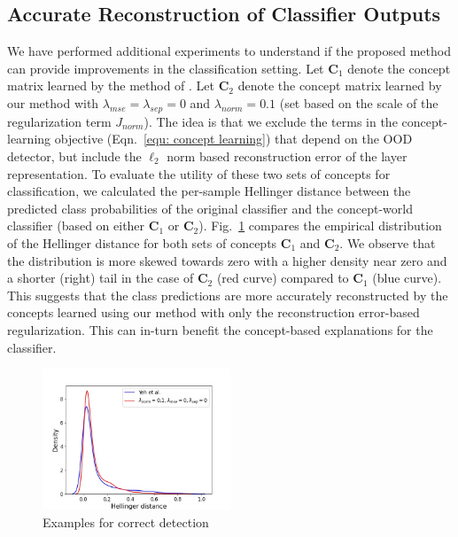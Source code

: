 \subsection{Accurate Reconstruction of Classifier Outputs}
\label{app:hellinger}
We have performed additional experiments to understand if the proposed method can provide improvements in the classification setting. 
Let $\mathbf{C}_1$ denote the concept matrix learned by the method of \citet{yeh2020completeness}. 
Let $\mathbf{C}_2$ denote the concept matrix learned by our method with $\lambda_{mse} = \lambda_{sep} = 0$ and $\lambda_{norm} = 0.1$ (set based on the scale of the regularization term $J_{norm}$). The idea is that we exclude the terms in the concept-learning objective (Eqn.~\ref{equ: concept learning}) that depend on the OOD detector, but include the $\ell_2$ norm based reconstruction error of the layer representation. 
To evaluate the utility of these two sets of concepts for classification, we calculated the per-sample Hellinger distance between the predicted class probabilities of the original classifier and the concept-world classifier (based on either $\mathbf{C}_1$ or $\mathbf{C}_2$). 
Fig.~\ref{fig:hellinger} compares the empirical distribution of the Hellinger distance for both sets of concepts $\mathbf{C}_1$ and $\mathbf{C}_2$. We observe that the distribution is more skewed towards zero with a higher density near zero and a shorter (right) tail in the case of $\mathbf{C}_2$ (red curve) compared to $\mathbf{C}_1$ (blue curve). This suggests that the class predictions are more accurately reconstructed by the concepts learned using our method with only the reconstruction error-based regularization. This can in-turn benefit the concept-based explanations for the classifier.

\begin{figure}[t]
  \centering
  \includegraphics[width=0.5\textwidth]{figures/classification_hellinger.jpg}
\caption{Examples for correct detection}
\label{fig:hellinger}
\end{figure}


